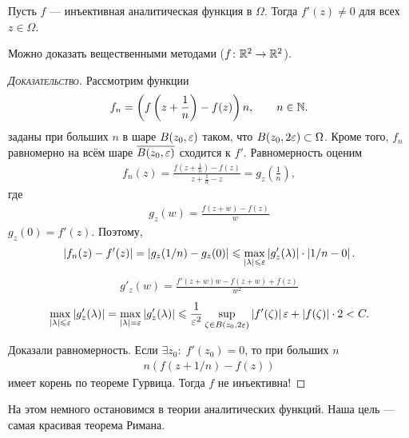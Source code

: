 \documentclass[../complex-analysis.tex]{subfiles}
\begin{document}
 \begin{thm}
  Пусть $ f $ --- инъективная аналитическая функция в $ \Omega $. Тогда $ f'(z) \neq 0 $ для всех $ z \in \Omega $.
 \end{thm}
 Можно доказать вещественными методами ($ f \colon \mathbb{R}^{2}\to\mathbb{R}^{2} $).
 \begin{proof}[\normalfont\textsc{Доказательство}]
  Рассмотрим функции
  \begin{align*}
   f_n = \left(f\left(z + \frac{1}{n}\right) - f(z) \right)n, \qquad n \in \mathbb{N}. 
\end{align*} заданы при больших $ n $ в шаре $ B(z_0, \varepsilon) $ таком, что $ B(z_0, 2\varepsilon) \subset \Omega $. Кроме того, $ f_n $ равномерно на всём шаре $ \overline {B(z_0,\varepsilon)} $ сходится к $ f' $. Равномерность оценим
  \begin{align*}
   f_n(z) = \frac{f\left(z + \frac{1}{n}\right) - f(z)}{z + \frac{1}{n} - z} = g_z \left( \frac{1}{n} \right),
  \end{align*} где \begin{align*}
   g_z(w) = \frac{f(z+w)-f(z)}{w}
  \end{align*} $ g_z(0) = f'(z) $. Поэтому,
  \begin{align*}
   \left|f_n(z) - f'(z) \right| = \left|g_z(1 / n) - g_z(0) \right| \leqslant \max_{\left| \lambda \right| \leqslant \varepsilon} \left| g'_z(\lambda) \right| \cdot \left| 1 / n - 0 \right|.
  \end{align*}
  \begin{align*}
   g'_z(w) = \frac{f'(z + w)w - f(z + w) + f(z)}{w^{2}}
  \end{align*}
  \begin{align*}
   \max_{\left| \lambda \right| \leqslant \varepsilon} \left| g'_z(\lambda) \right| = \max_{\left| \lambda \right|=\varepsilon} \left| g'_z(\lambda) \right| \leqslant \frac{1}{\varepsilon^{2}} \sup_{\zeta \in B(z_0,2\varepsilon)} \left| f'(\zeta) \right| \varepsilon + \left| f(\zeta) \right| \cdot 2 < C.
  \end{align*}

  Доказали равномерность. Если $ \exists z_0 \colon\; f'(z_0) = 0  $, то при больших $ n $
  \begin{align*}
   n(f(z + 1 / n) - f(z))
  \end{align*} имеет корень по теореме Гурвица. Тогда $ f $ не инъективна!
 \end{proof}


 На этом немного остановимся в теории аналитических функций. Наша цель --- самая красивая теорема Римана.
\end{document}
